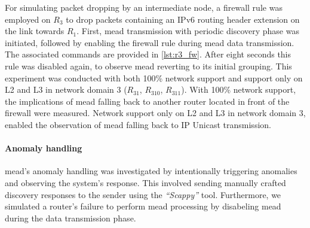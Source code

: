 For simulating packet dropping by an intermediate node, a firewall rule was
    employed on $R_3$ to drop packets containing an IPv6 routing header extension
    on the link towards $R_1$.
First, \gls{mead} transmission with periodic discovery phase was initiated,
    followed by enabling the firewall rule during \gls{mead} data transmission.
The associated commands are provided in \autoref{lst:r3_fw}.
After eight seconds this rule was disabled again, to observe \gls{mead} reverting to
    its initial grouping.
This experiment was conducted with both 100\% network support and support only
    on L2 and L3 in network domain 3 ($R_{31}$, $R_{310}$, $R_{311}$).
With 100\% network support, the implications of \gls{mead} falling back to
    another router located in front of the firewall were measured.
Network support only on L2 and L3 in network domain 3, enabled the
    observation of \gls{mead} falling back to IP Unicast transmission.

\paragraph{Anomaly handling} %
\label{par:Anomaly handling}
\gls{mead}'s anomaly handling was investigated by intentionally triggering
    anomalies and observing the system's response.
This involved sending manually crafted discovery responses to the sender using
    the \textit{``Scappy''} tool.
Furthermore, we simulated a router's failure to perform \gls{mead} processing by
    disabeling \gls{mead} during the data transmission phase.

